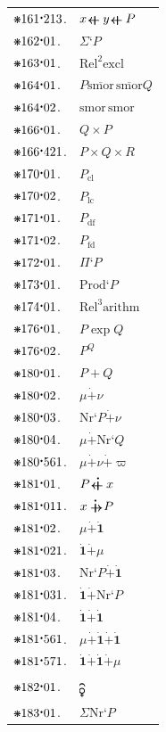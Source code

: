 \documentclass[12pt,openany,leqno,twocolumn]{book}
\newcommand{\pmast}{\text{\resizebox{!}{.75\height}{\ding{107}}}} %
\newcommand{\pmcdot}{\text{\raisebox{.05cm}{$\boldsymbol\cdot$}}} %
\newcommand{\pmbreve}[1]{\mathbf{\breve{\text{$#1$}}}}
\newcommand{\pmcirc}[1]{\mathbf{\dot{\text{$#1$}}}}
\newcommand{\Female}{{\usefont{U}{mvs}{m}{n}\symbol{126}}} %
\newcommand{\pmop}{\mathop{\text{\Female}}} %
\newcommand{\pmSmor}{\text{smor}}
\newcommand{\pmnr}[1]{\text{Nr}\textbf{`}#1} %
\newcommand{\pmNr}{\text{Nr}}
\newcommand{\pmRsum}{\mathrel{\ooalign{${\raise-.21ex\hbox{$\boldsymbol{-}$}}$\cr\hidewidth$\boldsymbol{\uparrow}$\hidewidth\cr${\raise-.19ex\hbox{$\boldsymbol{-}$}}$}}}
\newcommand{\pmRsume}{\rotatebox[origin=c]{270}{$\pmRsum$} }
\newcommand{\pmrsumb}[2]{#1 \mathrel{\rotatebox[origin=c]{90}{$\pmRsum$}} #2} %
\newcommand{\pmRsumb}{\rotatebox[origin=c]{90}{$\pmRsum$}}
\newcommand{\pmrsumr}[1]{\Sigma\textbf{`}#1} %
\newcommand{\pmrsumrex}[1]{\mathrel{\text{Rel}^{#1}\text{excl}}} %
\newcommand{\pmsmorsmorb}[2]{#1 \mathrel{\overline{\text{smor}}\,\overline{\text{smor}}} #2} %
\newcommand{\pmSmorsmor}{\pmSmor\,\pmSmor}
\newcommand{\pmrprod}[2]{#1 \times #2} %
\newcommand{\pmRfdcl}[1]{#1_{\text{cl}}}
\newcommand{\pmRfdlc}[1]{#1_{\text{lc}}}
\newcommand{\pmRfddf}[1]{#1_{\text{df}}}
\newcommand{\pmRfdfd}[1]{#1_{\text{fd}}}
\newcommand{\pmrfprod}[1]{\Pi\textbf{`}#1} %
\newcommand{\pmRfprod}[1]{\text{Prod}\textbf{`}#1} %
\newcommand{\pmrarrel}[1]{\mathrel{\text{Rel}^{#1}\text{arithm}}} %
\newcommand{\pmrexp}{\mathrel{\text{exp}}} %
\newcommand{\pmRexp}[2]{{#1}^{#2}} %
\newcommand{\pmrnsum}[2]{{#1} + {#2}} %
\newcommand{\pmrndsum}[2]{{#1} \mathrel{\pmcirc{+}} {#2}} %
\newcommand{\pmrnsumru}[2]{#1 \mathrel{\pmcirc{\pmRsumb}} #2} %
\newcommand{\pmrnsumur}[2]{#1 \mathrel{\pmcirc{\pmRsume}} #2} %
\newcommand{\pmrn}[1]{\pmcirc{#1}} %
\newcommand{\pmrsep}[1]{\ooalign{${\raise1.5ex\hbox{\rotatebox[origin=c]{180}{\scalebox{1.4}[1.4]{$\pmbreve{\phantom{.}}$}}}}$\cr\hidewidth$#1$\hidewidth}} %
\newcommand{\pmrnsumf}[1]{\Sigma\pmNr\textbf{`}#1} %
\begin{document}
\begin{tabular}{l l}
	$\pmast161\pmcdot213$. & $\pmrsumb{\pmrsumb{x}{y}}{P}$ \\
	$\pmast162\pmcdot01$. & $\pmrsumr{P}$ \\
	$\pmast163\pmcdot01$. & $\pmrsumrex{2}$ \\
	$\pmast164\pmcdot01$. & $\pmsmorsmorb{P}{Q}$ \\
	$\pmast164\pmcdot02$. & $\pmSmorsmor$ \\
	$\pmast166\pmcdot01$. & $\pmrprod{Q}{P}$ \\
	$\pmast166\pmcdot421$. & $\pmrprod{P}{\pmrprod{Q}{R}}$ \\
	$\pmast170\pmcdot01$. & $\pmRfdcl{P}$ \\
	$\pmast170\pmcdot02$. & $\pmRfdlc{P}$ \\
	$\pmast171\pmcdot01$. & $\pmRfddf{P}$ \\
	$\pmast171\pmcdot02$. & $\pmRfdfd{P}$ \\
	$\pmast172\pmcdot01$. & $\pmrfprod{P}$ \\
	$\pmast173\pmcdot01$. & $\pmRfprod{P}$ \\
	$\pmast174\pmcdot01$. & $\pmrarrel{3}$ \\
	$\pmast176\pmcdot01$. & $P \pmrexp Q$ \\
	$\pmast176\pmcdot02$. & $\pmRexp{P}{Q}$ \\
	$\pmast180\pmcdot01$. & $\pmrnsum{P}{Q}$ \\
	$\pmast180\pmcdot02$. & $\pmrndsum{\mu}{\nu}$ \\
	$\pmast180\pmcdot03$. & $\pmrndsum{\pmnr{P}}{\nu}$ \\
	$\pmast180\pmcdot04$. & $\pmrndsum{\mu}{\pmnr{Q}}$ \\
	$\pmast180\pmcdot561$. & $\pmrndsum{\mu}{\pmrndsum{\nu}{\varpi}}$ \\
	$\pmast181\pmcdot01$. & $\pmrnsumru{P}{x}$ \\
	$\pmast181\pmcdot011$. & $\pmrnsumur{x}{P}$ \\
	$\pmast181\pmcdot02$. & $\pmrndsum{\mu}{\pmrn{1}}$ \\
	$\pmast181\pmcdot021$. & $\pmrndsum{\pmrn{1}}{\mu}$ \\
	$\pmast181\pmcdot03$. & $\pmrndsum{\pmnr{P}}{\pmrn{1}}$ \\
	$\pmast181\pmcdot031$. & $\pmrndsum{\pmrn{1}}{\pmnr{P}}$ \\
	$\pmast181\pmcdot04$. & $\pmrndsum{\pmrn{1}}{\pmrn{1}}$ \\
	$\pmast181\pmcdot561$. & $\pmrndsum{\mu}{\pmrndsum{\pmrn{1}}{\pmrn{1}}}$ \\
	$\pmast181\pmcdot571$. & $\pmrndsum{\pmrn{1}}{\pmrndsum{\pmrn{1}}{\mu}}$ \\
	$\pmast182\pmcdot01$. & $\pmrsep{\pmop}$ \\
	$\pmast183\pmcdot01$. & $\pmrnsumf{P}$ 
\end{tabular}
\end{document}
